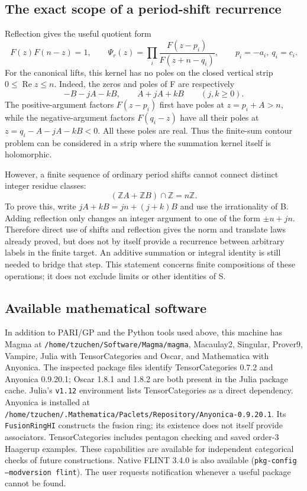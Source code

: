 \documentclass[11pt,reqno]{amsart}
\theoremstyle{plain}
\begin{document}
\subsection{The exact scope of a period-shift recurrence}\label{sec:79.4}

Reflection gives the useful quotient form
\[
 F(z)F(n-z)=1,\qquad
 \Psi_r(z)=\prod_i\frac{F(z-p_i)}{F(z+n-q_i)},
 \qquad p_i=-a_i,\ q_i=c_i.
\]
For the canonical lifts, this kernel has no poles on the closed
vertical strip \(0\le\operatorname{Re}z\le n\). Indeed,
the zeros and poles of F are respectively
\[
 -B-jA-kB,\qquad A+jA+kB\qquad(j,k\ge0).
\]
The positive-argument factors \(F(z-p_i)\) first have poles
at \(z=p_i+A>n\), while the negative-argument factors
\(F(q_i-z)\) have all their poles at
\(z=q_i-A-jA-kB<0\). All these poles are real. Thus the
finite-sum contour problem can be considered in a strip where
the summation kernel itself is holomorphic.

However, a finite sequence of ordinary period shifts cannot
connect distinct integer residue classes:
\[
 \boxed{(\mathbb ZA+\mathbb ZB)\cap\mathbb Z=n\mathbb Z.}
\]
To prove this, write \(jA+kB=jn+(j+k)B\) and use the
irrationality of B. Adding reflection only changes an integer
argument to one of the form \(\pm u+jn\). Therefore direct
use of shifts and reflection gives the norm and translate laws
already proved, but does not by itself provide a recurrence
between arbitrary labels in the finite target. An additive
summation or integral identity is still needed to bridge that
step. This statement concerns finite compositions of these
operations; it does not exclude limits or other identities of S.

\subsection{Available mathematical software}\label{sec:79.5}

In addition to PARI/GP and the Python tools used above, this machine has
Magma at \texttt{/home/tzuchen/Software/Magma/magma}, Macaulay2, Singular,
Prover9, Vampire, Julia with TensorCategories and Oscar, and Mathematica
with Anyonica. The inspected package files identify TensorCategories
0.7.2 and Anyonica 0.9.20.1; Oscar 1.8.1 and 1.8.2 are both present in
the Julia package cache. Julia's \texttt{v1.12} environment lists TensorCategories
as a direct dependency. Anyonica is installed at
\texttt{/home/tzuchen/.Mathematica/Paclets/Repository/Anyonica-0.9.20.1}.
Its \texttt{FusionRingHI} constructs the fusion ring; its existence does not
itself provide associators. TensorCategories includes pentagon checking
and saved order-3 Haagerup examples. These capabilities are available for
independent categorical checks of future constructions. Native FLINT
3.4.0 is also available (\texttt{pkg-config --modversion flint}). The user
requests notification whenever a useful package cannot be found.
\end{document}
